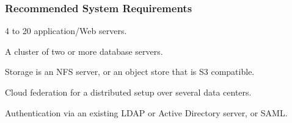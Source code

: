 \documentclass[letterpaper,10pt,english]{sphinxmanual}
\begin{document}
\subsubsection{Recommended System Requirements}
\label{installation/deployment_recommendations:id2}
4 to 20 application/Web servers.

A cluster of two or more database servers.

Storage is an NFS server, or an object store that is S3 compatible.

Cloud federation for a distributed setup over several data centers.

Authentication via an existing LDAP or Active Directory server, or SAML.
\begin{figure}[htbp]
\centering

\end{figure}
\end{document}
